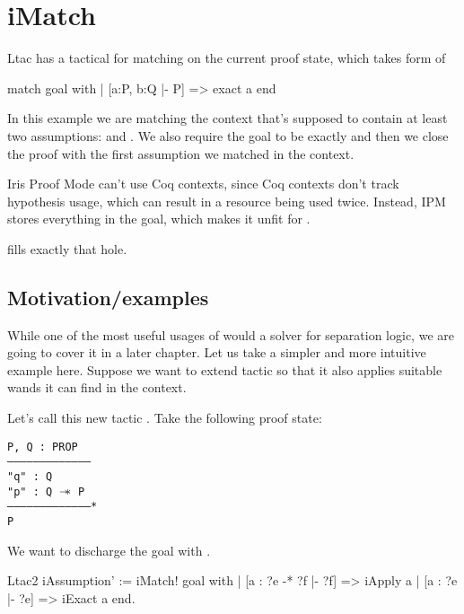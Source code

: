\chapter{iMatch}
\label{chap:imatch}


Ltac has a tactical for matching on the current proof state, which takes form of

\begin{coq}
match goal with
| [a:P, b:Q |- P] => exact a
end
\end{coq}
In this example we are matching the context that's supposed to contain at least two assumptions:  and .
We also require the goal to be exactly  and then we close the proof with the first assumption we matched in the context.\

Iris Proof Mode can't use Coq contexts, since Coq contexts don't track hypothesis usage, which can result in a resource being used twice.
Instead, IPM stores everything in the goal, which makes it unfit for .

 fills exactly that hole.

\section{Motivation/examples}

While one of the most useful usages of  would a solver for separation logic, we are going to cover it in a later chapter.
Let us take a simpler and more intuitive example here.
Suppose we want to extend  tactic so that it also applies suitable wands it can find in the context.

Let's call this new tactic .
Take the following proof state:\\
\begin{minipage}{\linewidth}
\texttt{P, Q : PROP\\
---------------------------------------\\
"q" : Q\\
"p" : Q $\mathrel{-\mkern-6mu*}$ P\\
---------------------------------------*\\
P
}
\end{minipage}

We want to discharge the goal with .

\begin{minipage}{\linewidth}
\begin{coq}
Ltac2 iAssumption' :=
  iMatch! goal with
  | [a : ?e -* ?f |- ?f] => iApply a
  | [a : ?e |- ?e] => iExact a
  end.
\end{coq}
\end{minipage}

